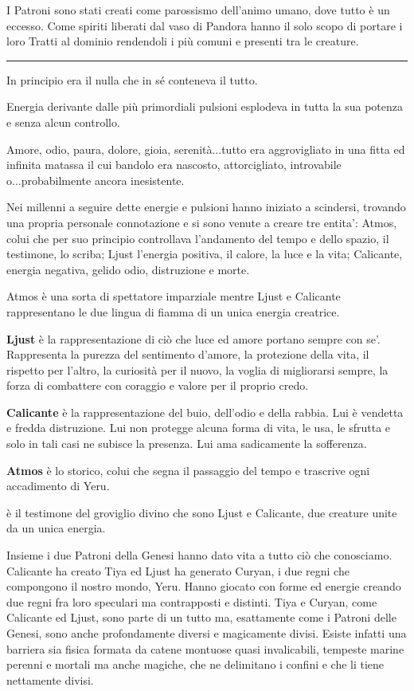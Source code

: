 \documentclass[a4paper,11pt,twoside,openany]{book}
\begin{document}
I Patroni sono stati creati come parossismo dell'animo umano, dove tutto è un eccesso. Come spiriti liberati dal vaso di Pandora hanno il solo scopo di portare i loro Tratti al dominio rendendoli i più comuni e presenti tra le creature.

\noindent\rule{\textwidth}{1pt}

\bigskip

In principio era il nulla che in sé conteneva il tutto.

Energia derivante dalle più primordiali pulsioni esplodeva in tutta la sua potenza e senza alcun controllo.

Amore, odio, paura, dolore, gioia, serenità...tutto era aggrovigliato in una fitta ed infinita matassa il cui bandolo era nascosto, attorcigliato, introvabile o...probabilmente ancora inesistente.

Nei millenni a seguire dette energie e pulsioni hanno iniziato a scindersi, trovando una propria personale connotazione e si sono venute a creare tre entita': Atmos, colui che per suo principio controllava l'andamento del tempo e dello spazio, il testimone, lo scriba; Ljust l'energia positiva, il calore, la luce e la vita; Calicante, energia negativa, gelido odio, distruzione e morte.

Atmos è una sorta di spettatore imparziale mentre Ljust e Calicante rappresentano le due lingua di fiamma di un unica energia creatrice.

\textbf{Ljust} è la rappresentazione di ciò che luce ed amore portano sempre con se'. Rappresenta la purezza del sentimento d'amore, la protezione della vita, il rispetto per l'altro, la curiosità per il nuovo, la voglia di migliorarsi sempre, la forza di combattere con coraggio e valore per il proprio credo.

\textbf{Calicante} è la rappresentazione del buio, dell'odio e della rabbia. Lui è vendetta e fredda distruzione. Lui non protegge alcuna forma di vita, le usa, le sfrutta e solo in tali casi ne subisce la presenza. Lui ama sadicamente la sofferenza.

\textbf{Atmos} è lo storico, colui che segna il passaggio del tempo e trascrive ogni accadimento di Yeru.

è il testimone del groviglio divino che sono Ljust e Calicante, due creature unite da un unica energia.

Insieme i due Patroni della Genesi hanno dato vita a tutto ciò che conosciamo. Calicante ha creato Tiya ed Ljust ha generato Curyan, i due regni che compongono il nostro mondo, Yeru. Hanno giocato con forme ed energie creando due regni fra loro speculari ma contrapposti e distinti. Tiya e Curyan, come Calicante ed Ljust, sono parte di un tutto ma, esattamente come i Patroni delle Genesi, sono anche profondamente diversi e magicamente divisi. Esiste infatti una barriera sia fisica formata da catene montuose quasi invalicabili, tempeste marine perenni e mortali ma anche magiche, che ne delimitano i confini e che li tiene nettamente divisi.
\end{document}
